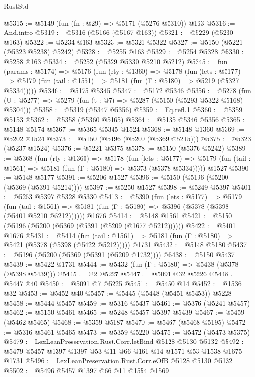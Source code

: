 \begin{lexlean}{RustStd}
\begin{coremodule}
{\begin{coremodule}
{{{{{{{{{{{{{{{{{{{{{{{{{{{{{{{{@5315 := @5149 (fun (fn : @29) => @5171 (@5276 @5310)) @163
@5316 := And.intro
@5319 := @5316 (@5166 (@5167 @163))
@5321 := @5229 (@5230 @163)
@5322 := @5234 @163
@5323 := @5321 @5322
@5327 := @5150 (@5221 (@5323 @5238) @5242)
@5328 := @5255 @163
@5329 := @5254 @5328
@5330 := @5258 @163
@5334 := @5252 (@5329 @5330 @5210 @5212)
@5345 := fun (params : @5174) =>
  @5176
    (fun (rty : @1360) =>
    @5178
      (fun (lets : @5177) =>
      @5179 (fun (tail : @1561) => @5181 (fun (Γ : @5180) => @5219 (@5327 @5334)))))
@5346 := @5175 @5345
@5347 := @5172 @5346
@5356 := @5278 (fun (U : @5277) => @5279 (fun (t : @7) => @5287 (@5150 (@5293 @5322 @5168) @5304)))
@5358 := @5319 (@5347 @5356)
@5359 := Eq.refl.{1}
@5360 := @5359 @5153
@5362 := @5358 (@5360 @5165)
@5364 := @5135 @5346 @5356
@5365 := @5148 @5174
@5367 := @5365 @5345 @1524
@5368 := @5148 @1360
@5369 := @5202 @1524
@5373 := @5150 (@5196 (@5200 (@5369 @5215)))
@5375 := @5323 (@5237 @1524)
@5376 := @5221 @5375
@5378 := @5150 (@5376 @5242)
@5389 := @5368
    (fun (rty : @1360) =>
    @5178
      (fun (lets : @5177) =>
      @5179 (fun (tail : @1561) => @5181 (fun (Γ : @5180) => @5373 (@5378 @5334)))))
    @1527
@5390 := @5148 @5177
@5391 := @5206 @1527
@5396 := @5150 (@5196 (@5200 (@5369 (@5391 @5214))))
@5397 := @5250 @1527
@5398 := @5249 @5397
@5401 := @5253 @5397 @5328 @5330
@5413 := @5390
    (fun (lets : @5177) =>
    @5179
      (fun (tail : @1561) => @5181 (fun (Γ : @5180) => @5396 (@5378 (@5398 (@5401 @5210 @5212))))))
    @1676
@5414 := @5148 @1561
@5421 := @5150 (@5196 (@5200 (@5369 (@5391 (@5209 (@1677 @5212))))))
@5422 := @5401 @1676
@5431 := @5414
    (fun (tail : @1561) => @5181 (fun (Γ : @5180) => @5421 (@5378 (@5398 (@5422 @5212)))))
    @1731
@5432 := @5148 @5180
@5437 := @5196 (@5200 (@5369 (@5391 (@5209 @1732))))
@5438 := @5150 @5437
@5439 := @5422 @1731
@5444 := @5432 (fun (Γ : @5180) => @5438 (@5378 (@5398 @5439)))
@5445 := @2 @5227
@5447 := @5091 @32 @5226
@5448 := @5447 @40
@5450 := @5091 @7 @5225
@5451 := @5450 @14
@5452 := @1536 @32
@5453 := @5452 @40
@5457 := @5445 (@5448 (@5451 @5453)) @5228
@5458 := @5444 @5457
@5459 := @5316 @5437
@5461 := @5376 (@5241 @5457)
@5462 := @5150 @5461
@5465 := @5248 @5457 @5397 @5439
@5467 := @5459 (@5462 @5465)
@5468 := @5359 @5187
@5470 := @5467 (@5468 @5195)
@5472 := @5316 @5461 @5465
@5473 := @5359 @5220
@5475 := @5472 (@5473 @5375)
@5479 := LexLeanPreservation.Rust.Corr.letBind @5128 @5130 @5132
@5492 := @5479 @5457 @1397 @1397 @53 @11 @66 @161 @14 @1571 @53 @1538 @1675 @1731
@5496 := LexLeanPreservation.Rust.Corr.eOfB @5128 @5130 @5132
@5502 := @5496 @5457 @1397 @66 @11 @1554 @1569
}}}}}}}}}}}}}}}}}}}}}}}}}}}}}}}}
\end{coremodule}}
\end{coremodule}
\end{lexlean}
